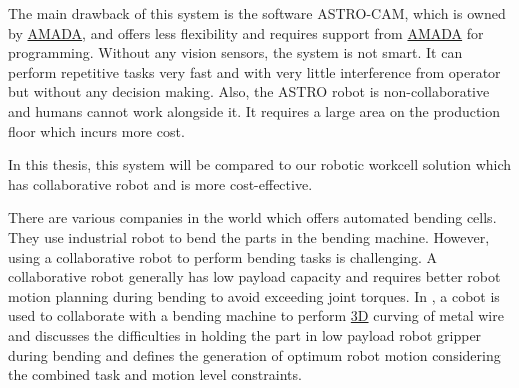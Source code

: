 The main drawback of this system is the software ASTRO-CAM, which is owned by \hyperref[acro:AMADA]{AMADA}, and offers less flexibility and requires support from \hyperref[acro:AMADA]{AMADA} for programming. Without any vision sensors, the system is not smart. It can perform repetitive tasks very fast and with very little interference from operator but without any decision making. Also, the ASTRO robot is non-collaborative and humans cannot work alongside it.
It requires a large area on the production floor which incurs more cost.

In this thesis, this system will be compared to our robotic workcell solution which has collaborative robot and is more cost-effective.

There are various companies in the world which offers automated bending cells. They use industrial robot to bend the parts in the bending machine. \cite{mekoprint, shenchong} However, using a collaborative robot to perform bending tasks is challenging. A collaborative robot generally has low payload capacity and requires better robot motion planning during bending to avoid exceeding joint torques.
In \cite{liu2022metalwiremanipulationplanning}, a cobot is used to collaborate with a bending machine to perform \hyperref[acro:3D]{3D} curving of metal wire and discusses the difficulties in holding the
part in low payload robot gripper during bending and defines the generation of optimum robot motion considering the combined task and motion level constraints.